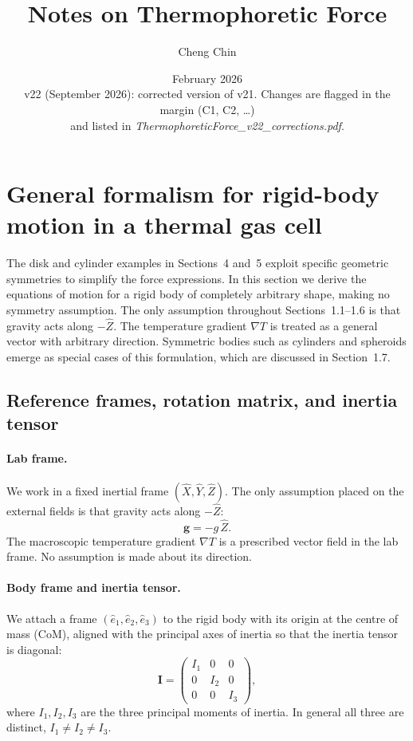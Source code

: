 \documentclass[11pt]{article}
\title{Notes on Thermophoretic Force}
\author{Cheng Chin}
\date{February 2026 \\[2pt] \small v22 (September 2026): corrected version of v21. Changes are flagged in the margin (C1, C2, \ldots) \\ \small and listed in \emph{ThermophoreticForce\_v22\_corrections.pdf}.}
\newcommand{\chg}[1]{\marginpar{\raggedright\footnotesize\textcolor{red!70!black}{\textsf{#1}}}}
\newcommand{\vect}[1]{\bm{#1}}
\begin{document}
\maketitle

\section{General formalism for rigid-body motion in a thermal gas cell}
The disk and cylinder examples in Sections~4 and~5 exploit specific geometric symmetries to simplify the force expressions.\chg{C1} In this section we derive the equations of motion for a rigid body of completely arbitrary shape, making no symmetry assumption. The only assumption throughout Sections~1.1--1.6 is that gravity acts along $-\hat Z$. The temperature gradient $\nabla T$ is treated as a general vector with arbitrary direction. Symmetric bodies such as cylinders and spheroids emerge as special cases of this formulation, which are discussed in Section~1.7.

\subsection{Reference frames, rotation matrix, and inertia tensor}
\paragraph{Lab frame.} We work in a fixed inertial frame $(\hat X,\hat Y,\hat Z)$. The only assumption placed on the external fields is that gravity acts along $-\hat Z$:
\begin{equation}
  \vect g = -g\,\hat Z .
\end{equation}
The macroscopic temperature gradient $\nabla T$ is a prescribed vector field in the lab frame. No assumption is made about its direction.

\paragraph{Body frame and inertia tensor.} We attach a frame $(\hat e_1,\hat e_2,\hat e_3)$ to the rigid body with its origin at the centre of mass (CoM), aligned with the principal axes of inertia so that the inertia tensor is diagonal:
\begin{equation}
  \mathbf I = \begin{pmatrix} I_1 & 0 & 0\\ 0 & I_2 & 0\\ 0 & 0 & I_3\end{pmatrix},
\end{equation}
where $I_1,I_2,I_3$ are the three principal moments of inertia. In general all three are distinct, $I_1\neq I_2\neq I_3$.
\end{document}
